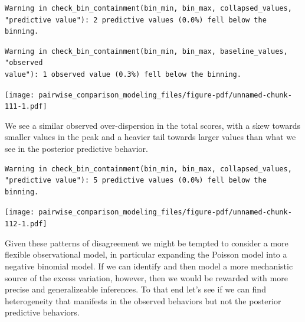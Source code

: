 \documentclass[
  letterpaper,
  DIV=11,
  numbers=noendperiod]{scrartcl}
\newenvironment{Shaded}{\begin{snugshade}}{\end{snugshade}}
\newcommand{\AttributeTok}[1]{\textcolor[rgb]{0.40,0.45,0.13}{#1}}
\newcommand{\DecValTok}[1]{\textcolor[rgb]{0.68,0.00,0.00}{#1}}
\newcommand{\FunctionTok}[1]{\textcolor[rgb]{0.28,0.35,0.67}{#1}}
\newcommand{\NormalTok}[1]{\textcolor[rgb]{0.00,0.23,0.31}{#1}}
\newcommand{\SpecialCharTok}[1]{\textcolor[rgb]{0.37,0.37,0.37}{#1}}
\newcommand{\StringTok}[1]{\textcolor[rgb]{0.13,0.47,0.30}{#1}}
\begin{document}
\begin{verbatim}
Warning in check_bin_containment(bin_min, bin_max, collapsed_values,
"predictive value"): 2 predictive values (0.0%) fell below the binning.
\end{verbatim}

\begin{verbatim}
Warning in check_bin_containment(bin_min, bin_max, baseline_values, "observed
value"): 1 observed value (0.3%) fell below the binning.
\end{verbatim}

\texttt{[image: pairwise\_comparison\_modeling\_files/figure-pdf/unnamed-chunk-111-1.pdf]}

We see a similar observed over-dispersion in the total scores, with a
skew towards smaller values in the peak and a heavier tail towards
larger values than what we see in the posterior predictive behavior.

\begin{Shaded}
\end{Shaded}

\begin{verbatim}
Warning in check_bin_containment(bin_min, bin_max, collapsed_values,
"predictive value"): 5 predictive values (0.0%) fell below the binning.
\end{verbatim}

\texttt{[image: pairwise\_comparison\_modeling\_files/figure-pdf/unnamed-chunk-112-1.pdf]}

Given these patterns of disagreement we might be tempted to consider a
more flexible observational model, in particular expanding the Poisson
model into a negative binomial model. If we can identify and then model
a more mechanistic source of the excess variation, however, then we
would be rewarded with more precise and generalizeable inferences. To
that end let's see if we can find heterogeneity that manifests in the
observed behaviors but not the posterior predictive behaviors.
\end{document}
